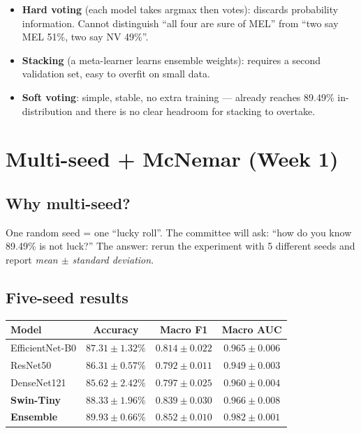 \documentclass[11pt,a4paper]{article}
\begin{document}
\begin{itemize}[leftmargin=*]
  \item \textbf{Hard voting} (each model takes argmax then votes): discards probability information. Cannot distinguish ``all four are sure of MEL'' from ``two say MEL 51\%, two say NV 49\%''.
  \item \textbf{Stacking} (a meta-learner learns ensemble weights): requires a second validation set, easy to overfit on small data.
  \item \textbf{Soft voting}: simple, stable, no extra training --- already reaches 89.49\% in-distribution and there is no clear headroom for stacking to overtake.
\end{itemize}

\section{Multi-seed + McNemar (Week 1)}

\subsection{Why multi-seed?}

\begin{simple}
One random seed = one ``lucky roll''. The committee will ask: ``how do you know 89.49\% is not luck?'' The answer: rerun the experiment with 5 different seeds and report \textit{mean $\pm$ standard deviation}.
\end{simple}

\subsection{Five-seed results}

\begin{table}[h]
\centering\small
\begin{tabular}{lccc}
\toprule
\textbf{Model} & \textbf{Accuracy} & \textbf{Macro F1} & \textbf{Macro AUC} \\
\midrule
EfficientNet-B0  & $87.31 \pm 1.32\%$ & $0.814 \pm 0.022$ & $0.965 \pm 0.006$ \\
ResNet50         & $86.31 \pm 0.57\%$ & $0.792 \pm 0.011$ & $0.949 \pm 0.003$ \\
DenseNet121      & $85.62 \pm 2.42\%$ & $0.797 \pm 0.025$ & $0.960 \pm 0.004$ \\
\textbf{Swin-Tiny} & $\mathbf{88.33 \pm 1.96\%}$ & $\mathbf{0.839 \pm 0.030}$ & $0.966 \pm 0.008$ \\
\midrule
\rowcolor{usthblue!10}\textbf{Ensemble} & $\mathbf{89.93 \pm 0.66\%}$ & $\mathbf{0.852 \pm 0.010}$ & $\mathbf{0.982 \pm 0.001}$ \\
\bottomrule
\end{tabular}
\end{table}
\end{document}
